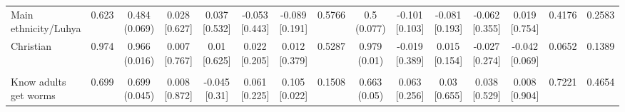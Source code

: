 {\begin{tabular}[t]{lcccccccccccccc}
\hspace{1em}Main ethnicity/Luhya & 0.623 & \makecell[c]{0.484\\(0.069)} & \makecell[c]{0.028\\{[0.627]}} & \makecell[c]{0.037\\{[0.532]}} & \makecell[c]{-0.053\\{[0.443]}} & \makecell[c]{-0.089\\{[0.191]}} & 0.5766 & \makecell[c]{0.5\\(0.077)} & \makecell[c]{-0.101\\{[0.103]}} & \makecell[c]{-0.081\\{[0.193]}} & \makecell[c]{-0.062\\{[0.355]}} & \makecell[c]{0.019\\{[0.754]}} & 0.4176 & 0.2583\\
\hspace{1em}Christian & 0.974 & \makecell[c]{0.966\\(0.016)} & \makecell[c]{0.007\\{[0.767]}} & \makecell[c]{0.01\\{[0.625]}} & \makecell[c]{0.022\\{[0.205]}} & \makecell[c]{0.012\\{[0.379]}} & 0.5287 & \makecell[c]{0.979\\(0.01)} & \makecell[c]{-0.019\\{[0.389]}} & \makecell[c]{0.015\\{[0.154]}} & \makecell[c]{-0.027\\{[0.274]}} & \makecell[c]{-0.042\\{[0.069]}} & 0.0652 & 0.1389\\
\addlinespace[0.3em]
\hline
\multicolumn{15}{l}{\textit{\textbf{Panel C: Deworming knowledge, $N=1,995$}}}\\
\hline
\hspace{1em}Know adults get worms & 0.699 & \makecell[c]{0.699\\(0.045)} & \makecell[c]{0.008\\{[0.872]}} & \makecell[c]{-0.045\\{[0.31]}} & \makecell[c]{0.061\\{[0.225]}} & \makecell[c]{0.105\\{[0.022]}} & 0.1508 & \makecell[c]{0.663\\(0.05)} & \makecell[c]{0.063\\{[0.256]}} & \makecell[c]{0.03\\{[0.655]}} & \makecell[c]{0.038\\{[0.529]}} & \makecell[c]{0.008\\{[0.904]}} & 0.7221 & 0.4654\\

\end{tabular}}
